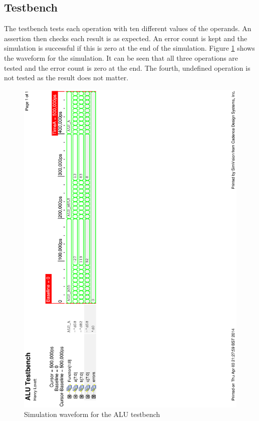 \subsection{Testbench}

The testbench tests each operation with ten different values of the operands. 
An assertion then checks each result is as expected. 
An error count is kept and the simulation is successful if this is zero at the end of the simulation.
Figure \ref{fig:alusim} shows the waveform for the simulation. 
It can be seen that all three operations are tested and the error count is zero at the end. 
The fourth, undefined operation is not tested as the result does not matter. 

\begin{figure}
\includegraphics[height=\textheight]{Figures/alusim.eps}
\caption{Simulation waveform for the ALU testbench}
\label{fig:alusim}
\end{figure}

